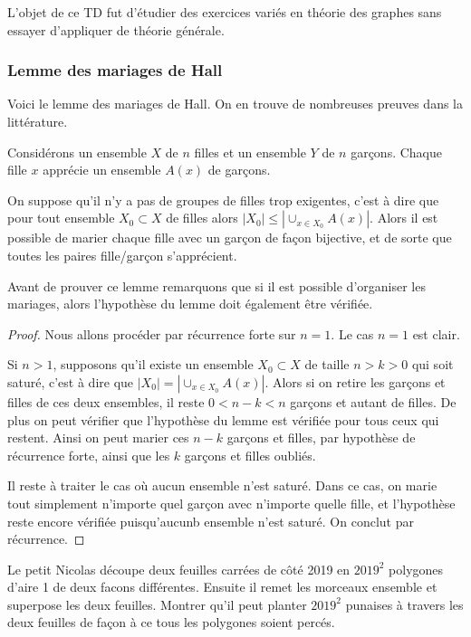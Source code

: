 
L'objet de ce TD fut d'étudier des exercices variés en théorie des graphes sans essayer d'appliquer de théorie générale.

\subsubsection*{Lemme des mariages de Hall}

Voici le lemme des mariages de Hall. On en trouve de nombreuses preuves dans la littérature.

\begin{lem}
Considérons un ensemble $X$ de $n$ filles et un ensemble $Y$ de $n$ garçons. Chaque fille $x$ apprécie un ensemble $A(x)$ de garçons.
\smallskip

 On suppose qu'il n'y a pas de groupes de filles trop exigentes, c'est à dire que pour tout ensemble $X_0\subset X$ de filles alors $|X_0|\leq |\cup_{x\in X_0} A(x)|$. Alors il est possible de marier chaque fille avec un garçon de façon bijective, et de sorte que toutes les paires fille/garçon s'apprécient.
\end{lem}

Avant de prouver ce lemme remarquons que si il est possible d'organiser les mariages, alors l'hypothèse du lemme doit également être vérifiée.

\begin{proof}

Nous allons procéder par récurrence forte sur $n=1$. Le cas $n=1$ est clair. 

\medskip

Si $n>1$, supposons qu'il existe un ensemble $X_0\subset X$ de taille $n>k>0$ qui soit saturé, c'est à dire que $|X_0|=|\cup_{x\in X_0}A(x)|$. Alors si on retire les garçons et filles de ces deux ensembles, il reste $0<n-k<n$ garçons et autant de filles. De plus on peut vérifier que l'hypothèse du lemme est vérifiée pour tous ceux qui restent. Ainsi on peut marier ces $n-k$ garçons et filles, par hypothèse de récurrence forte, ainsi que les $k$ garçons et filles oubliés.

Il reste à traiter le cas où aucun ensemble n'est saturé. Dans ce cas, on marie tout simplement n'importe quel garçon avec n'importe quelle fille, et l'hypothèse reste encore vérifiée puisqu'aucunb ensemble n'est saturé. On conclut par récurrence.
\end{proof}

\begin{exo}
Le petit Nicolas découpe deux feuilles carrées de côté 2019 en $2019^2$ polygones d'aire 1 de deux facons différentes. Ensuite il remet les morceaux ensemble et superpose les deux feuilles. Montrer qu'il peut planter $2019^2$ punaises à travers les deux feuilles de façon à ce tous les polygones soient percés.
\end{exo}


